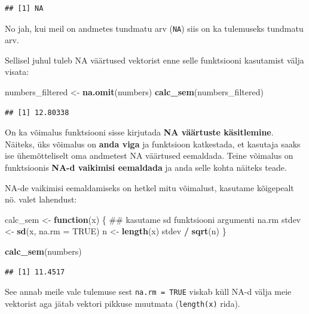 \documentclass[]{book}
\newenvironment{Shaded}{\begin{snugshade}}{\end{snugshade}}
\newcommand{\KeywordTok}[1]{\textcolor[rgb]{0.13,0.29,0.53}{\textbf{#1}}}
\newcommand{\DataTypeTok}[1]{\textcolor[rgb]{0.13,0.29,0.53}{#1}}
\newcommand{\StringTok}[1]{\textcolor[rgb]{0.31,0.60,0.02}{#1}}
\newcommand{\OtherTok}[1]{\textcolor[rgb]{0.56,0.35,0.01}{#1}}
\newcommand{\ControlFlowTok}[1]{\textcolor[rgb]{0.13,0.29,0.53}{\textbf{#1}}}
\newcommand{\OperatorTok}[1]{\textcolor[rgb]{0.81,0.36,0.00}{\textbf{#1}}}
\newcommand{\NormalTok}[1]{#1}
\begin{document}
\begin{verbatim}
## [1] NA
\end{verbatim}

No jah, kui meil on andmetes tundmatu arv (\texttt{NA}) siis on ka
tulemuseks tundmatu arv.

Sellisel juhul tuleb NA väärtused vektorist enne selle funktsiooni
kasutamist välja visata:

\begin{Shaded}
\begin{Highlighting}[]
\NormalTok{numbers_filtered <-}\StringTok{ }\KeywordTok{na.omit}\NormalTok{(numbers)}
\KeywordTok{calc_sem}\NormalTok{(numbers_filtered)}
\end{Highlighting}
\end{Shaded}

\begin{verbatim}
## [1] 12.80338
\end{verbatim}

On ka võimalus funktsiooni sisse kirjutada \textbf{NA väärtuste
käsitlemine}. Näiteks, üks võimalus on \textbf{anda viga} ja funktsioon
katkestada, et kasutaja saaks ise ühemõtteliselt oma andmetest NA
väärtused eemaldada. Teine võimalus on funktsioonis \textbf{NA-d
vaikimisi eemaldada} ja anda selle kohta näiteks teade.

NA-de vaikimisi eemaldamiseks on hetkel mitu võimalust, kasutame
kõigepealt nö. valet lahendust:

\begin{Shaded}
\begin{Highlighting}[]
\NormalTok{calc_sem <-}\StringTok{ }\ControlFlowTok{function}\NormalTok{(x) \{}
\NormalTok{  ## kasutame sd funktsiooni argumenti na.rm}
\NormalTok{  stdev <-}\StringTok{ }\KeywordTok{sd}\NormalTok{(x, }\DataTypeTok{na.rm =} \OtherTok{TRUE}\NormalTok{)}
\NormalTok{  n <-}\StringTok{ }\KeywordTok{length}\NormalTok{(x)}
\NormalTok{  stdev }\OperatorTok{/}\StringTok{ }\KeywordTok{sqrt}\NormalTok{(n)}
\NormalTok{\}}

\KeywordTok{calc_sem}\NormalTok{(numbers)}
\end{Highlighting}
\end{Shaded}

\begin{verbatim}
## [1] 11.4517
\end{verbatim}

See annab meile vale tulemuse sest \texttt{na.rm\ =\ TRUE} viskab küll
NA-d välja meie vektorist aga jätab vektori pikkuse muutmata
(\texttt{length(x)} rida).
\end{document}
